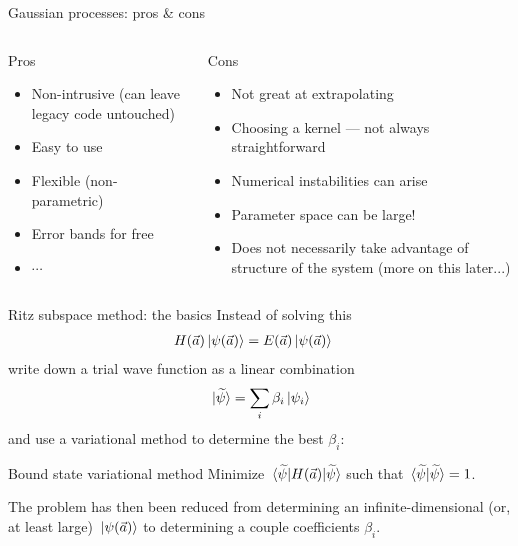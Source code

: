 \documentclass[xcolor=dvipsnames, aspectratio=169]{beamer}
\begin{document}
\begin{frame}{Gaussian processes: pros \& cons}

\begin{columns}[t]
\begin{column}{0.5\textwidth}
\begin{myblock}[valign=center]{Pros}
\setlength\leftmargini{0pt}
\begin{itemize}
\item Non-intrusive (can leave legacy code untouched)
\item Easy to use
\item Flexible (non-parametric)
\item Error bands for free
\item $\cdots$
\end{itemize}
\end{myblock}
\end{column}
\begin{column}{0.5\textwidth}
\begin{myblock}[valign=center]{Cons}
\setlength\leftmargini{0pt}
\begin{itemize}
\item Not great at extrapolating
\item Choosing a kernel --- not always straightforward
\item Numerical instabilities can arise
\item Parameter space can be large!
\item Does not necessarily take advantage of structure of the system (more on this later...)
\end{itemize}
\end{myblock}
\end{column}
\end{columns}
\end{frame}


\begin{frame}{Ritz subspace method: the basics}
Instead of solving this
\begin{align}
    H(\vec{a}) \ket*{\psi(\vec{a})} & = E(\vec{a}) \ket*{\psi(\vec{a})}
\end{align}
write down a \alert{trial wave function} as a linear combination
\begin{align}
    \ket*{\widetilde{\psi}} = \sum_i \beta_i \ket*{\psi_i}
\end{align}
and use a \alert{variational method} to determine the best $\beta_i$:

\begin{myblock}[valign=center]{Bound state variational method}
Minimize $\mel*{\widetilde{\psi}}{H(\vec{a})}{\widetilde{\psi}}$ such that $\braket*{\widetilde{\psi}}{\widetilde{\psi}} = 1$.
\end{myblock}

The problem has then been reduced from determining an infinite-dimensional (or, at least large) $\ket*{\psi(\vec{a})}$ to determining a couple coefficients $\beta_i$.
\end{frame}
\end{document}
